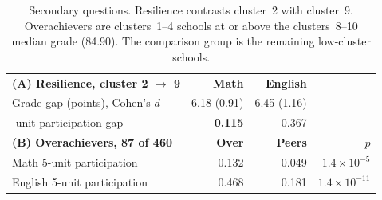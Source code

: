 \begin{table}[H]
\centering
\footnotesize
\renewcommand{\arraystretch}{1.25}
\caption{Secondary questions. Resilience contrasts cluster~2 with cluster~9.
Overachievers are clusters~1--4 schools at or above the clusters~8--10 median
grade (84.90). The comparison group is the remaining low-cluster schools.}
\label{tab:secondary}
\begin{tabular}{@{}>{\raggedright\arraybackslash}p{5.0cm}rrr@{}}
\toprule
\textbf{(A) Resilience, cluster 2 $\rightarrow$ 9} & \textbf{Math} & \textbf{English} & \\
Grade gap (points), Cohen's $d$ & 6.18 (0.91) & 6.45 (1.16) & \\
5-unit participation gap & \textbf{0.115} & 0.367 & \\
\midrule
\textbf{(B) Overachievers, 87 of 460} & \textbf{Over} & \textbf{Peers} & \textbf{$p$} \\
Math 5-unit participation & 0.132 & 0.049 & $1.4\!\times\!10^{-5}$ \\
English 5-unit participation & 0.468 & 0.181 & $1.4\!\times\!10^{-11}$ \\
\bottomrule
\end{tabular}
\end{table}
